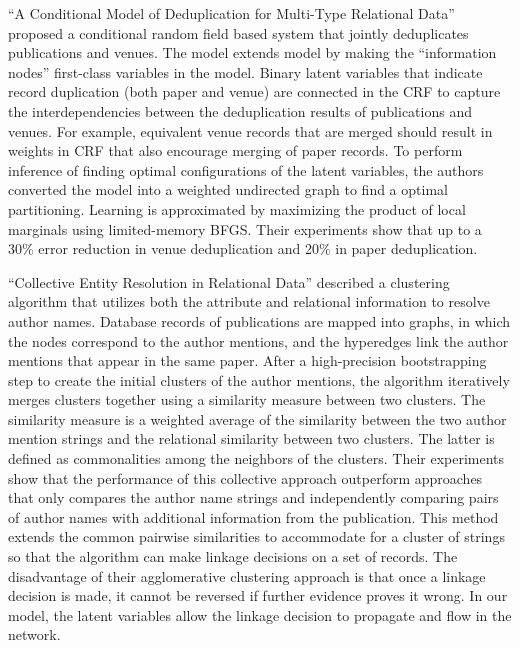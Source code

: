 \documentclass[]{article}
\begin{document}
``A Conditional Model of Deduplication for Multi-Type Relational Data'' \cite{Culotta05aconditional} proposed a conditional random field based system that jointly deduplicates publications and venues.  The model extends \cite{Domingos04multi} model by making the ``information nodes'' first-class variables in the model.  Binary latent variables that indicate record duplication (both paper and venue) are connected in the CRF to capture the interdependencies between the deduplication results of publications and venues.  For example, equivalent venue records that are merged should result in weights in CRF that also encourage merging of paper records.  To perform inference of finding optimal configurations of the latent variables, the authors converted the model into a weighted undirected graph to find a optimal partitioning.  Learning is approximated by maximizing the product of local marginals using limited-memory BFGS.  Their experiments show that up to a 30\% error reduction in venue deduplication and 20\% in paper deduplication.

``Collective Entity Resolution in Relational Data''  \cite{Bhattacharya2007} described a clustering algorithm that utilizes both the attribute and relational information to resolve author names.  Database records of publications are mapped into graphs, in which the nodes correspond to the author mentions, and the hyperedges link the author mentions that appear in the same paper.  After a high-precision bootstrapping step to create the initial clusters of the author mentions, the algorithm iteratively merges clusters together using a similarity measure between two clusters.  The similarity measure is a weighted average of the similarity between the two author mention strings and the relational similarity between two clusters.  The latter is defined as commonalities among the neighbors of the clusters.  Their experiments show that the performance of this collective approach outperform approaches that only compares the author name strings and independently comparing pairs of author names with additional information from the publication.  This method extends the common pairwise similarities to accommodate for a cluster of strings so that the algorithm can make linkage decisions on a set of records.  The disadvantage of their agglomerative clustering approach is that once a linkage decision is made, it cannot be reversed if further evidence proves it wrong.  In our model, the latent variables allow the linkage decision to propagate and flow in the network.




\end{document}

